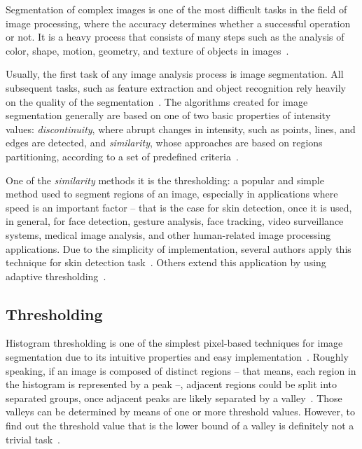 Segmentation of complex images is one of the most difficult tasks in the field of image processing, where the accuracy determines whether a successful operation or not. It is a heavy process that consists of many steps such as the analysis of color, shape, motion, geometry, and texture of objects in images~\citep{gonzalez:02}.

Usually, the first task of any image analysis process is image segmentation. All subsequent tasks, such as feature extraction and object recognition rely heavily on the quality of the segmentation~\citep{konstantinos:00}. The algorithms created for image segmentation generally are based on one of two basic properties of intensity values: \emph{discontinuity}, where abrupt changes in intensity, such as points, lines, and edges are detected, and \emph{similarity}, whose approaches are based on regions partitioning, according to a set of predefined criteria~\citep{gonzalez:02}.

One of the \emph{similarity} methods it is the thresholding: a popular and simple method used to segment regions of an image, especially in applications where speed is an important factor -- that is the case for skin detection, once it is used, in general, for face detection, gesture analysis, face tracking, video surveillance systems, medical image analysis, and other human-related image processing applications. Due to the simplicity of implementation, several authors apply this technique for skin detection task~\citep{kovac:03, chai:99, basilio:11, kaur:12, shaik:15, kumar:15}. Others extend this application by using adaptive thresholding~\citep{yogarajah:11, tan:12}.


\subsection{Thresholding}
\label{sec:thresholding}
Histogram thresholding is one of the simplest pixel-based techniques for image segmentation due to its intuitive properties and easy implementation~\citep{gonzalez:02}. Roughly speaking, if an image is composed of distinct regions -- that means, each region in the histogram is represented by a peak --, adjacent regions could be split into separated groups, once adjacent peaks are likely separated by a valley~\citep{konstantinos:00}. Those valleys can be determined by means of one or more threshold values. However, to find out the threshold value that is the lower bound of a valley is definitely not a trivial task~\citep{konstantinos:00}.


